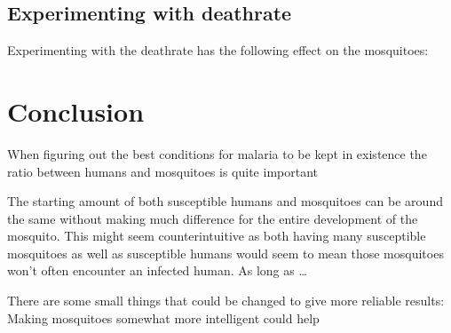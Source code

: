 \documentclass[a4paper]{report}
\begin{document}
\subsection{Experimenting with deathrate}
Experimenting with the deathrate has the following effect on the mosquitoes:



\section{Conclusion}
When figuring out the best conditions for malaria to be kept in existence the
ratio between humans and mosquitoes is quite important

The starting amount of both susceptible humans and mosquitoes can be around the
same without making much difference for the entire development of the mosquito.
This might seem counterintuitive as both having many susceptible mosquitoes as
well as susceptible humans would seem to mean those mosquitoes won't often
encounter an infected human. As long as \dots

There are some small things that could be changed to give more reliable results:
Making mosquitoes somewhat more intelligent could help

\end{document}
